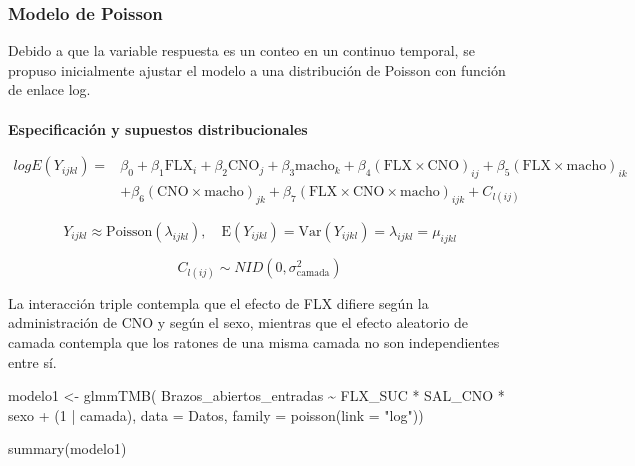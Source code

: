 \documentclass[
  letterpaper,
  DIV=11,
  numbers=noendperiod]{scrartcl}
\makeatletter
\let\oldparagraph\paragraph
\renewcommand{\paragraph}{
    \@ifstar
      \xxxParagraphStar
      \xxxParagraphNoStar
  }
\newcommand{\xxxParagraphStar}[1]{\oldparagraph*{#1}\mbox{}}
\newcommand{\xxxParagraphNoStar}[1]{\oldparagraph{#1}\mbox{}}
\newenvironment{Shaded}{\begin{snugshade}}{\end{snugshade}}
\newcommand{\AttributeTok}[1]{\textcolor[rgb]{0.40,0.45,0.13}{#1}}
\newcommand{\DecValTok}[1]{\textcolor[rgb]{0.68,0.00,0.00}{#1}}
\newcommand{\FunctionTok}[1]{\textcolor[rgb]{0.28,0.35,0.67}{#1}}
\newcommand{\NormalTok}[1]{\textcolor[rgb]{0.00,0.23,0.31}{#1}}
\newcommand{\OtherTok}[1]{\textcolor[rgb]{0.00,0.23,0.31}{#1}}
\newcommand{\SpecialCharTok}[1]{\textcolor[rgb]{0.37,0.37,0.37}{#1}}
\newcommand{\StringTok}[1]{\textcolor[rgb]{0.13,0.47,0.30}{#1}}
\makeatother
\begin{document}
\subsubsection{\texorpdfstring{\textbf{Modelo de
Poisson}}{Modelo de Poisson}}\label{modelo-de-poisson}

Debido a que la variable respuesta es un conteo en un continuo temporal,
se propuso inicialmente ajustar el modelo a una distribución de Poisson
con función de enlace log.

\paragraph{\texorpdfstring{\textbf{Especificación y supuestos
distribucionales}}{Especificación y supuestos distribucionales}}\label{especificaciuxf3n-y-supuestos-distribucionales}

\[\begin{aligned}
logE(Y_{ijkl}) = {} & \beta_0 + \beta_1 \text{FLX}_i + \beta_2 \text{CNO}_j + \beta_3\text{macho}_k + \beta_4 (\text{FLX} \times \text{CNO})_{ij} + \beta_5 (\text{FLX} \times \text{macho})_{ik}\\
& + \beta_6 (\text{CNO} \times \text{macho})_{jk} + \beta_7 (\text{FLX} \times \text{CNO} \times \text{macho})_{ijk} + C_{l(ij)}
\end{aligned}\]

\[Y_{ijkl} \approx \text{Poisson}(\lambda_{ijkl}), \quad \text{E}(Y_{ijkl}) = \text{Var}(Y_{ijkl}) = \lambda_{ijkl} = \mu_{ijkl}\]

\[C_{l(ij)} \sim NID(0,\sigma_\text{camada}^2)\]

La interacción triple contempla que el efecto de FLX difiere según la
administración de CNO y según el sexo, mientras que el efecto aleatorio
de camada contempla que los ratones de una misma camada no son
independientes entre sí.

\begin{Shaded}
\begin{Highlighting}[]
\NormalTok{modelo1 }\OtherTok{\textless{}{-}} \FunctionTok{glmmTMB}\NormalTok{(}
\NormalTok{  Brazos\_abiertos\_entradas }\SpecialCharTok{\textasciitilde{}}\NormalTok{ FLX\_SUC }\SpecialCharTok{*}\NormalTok{ SAL\_CNO }\SpecialCharTok{*}\NormalTok{ sexo }\SpecialCharTok{+}\NormalTok{ (}\DecValTok{1} \SpecialCharTok{|}\NormalTok{ camada),}
  \AttributeTok{data =}\NormalTok{ Datos,}
  \AttributeTok{family =} \FunctionTok{poisson}\NormalTok{(}\AttributeTok{link =} \StringTok{"log"}\NormalTok{))}

\FunctionTok{summary}\NormalTok{(modelo1)}
\end{Highlighting}
\end{Shaded}
\end{document}
